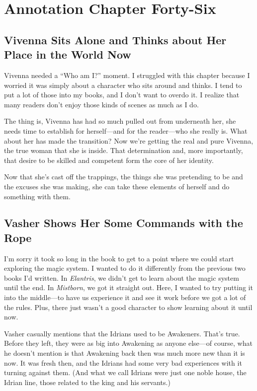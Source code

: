 \section{Annotation Chapter Forty-Six}

\subsection*{Vivenna Sits Alone and Thinks about Her Place in the World Now}

Vivenna needed a “Who am I?” moment. I struggled with this chapter because I worried it was simply about a character who sits around and thinks. I tend to put a lot of those into my books, and I don’t want to overdo it. I realize that many readers don’t enjoy those kinds of scenes as much as I do.

The thing is, Vivenna has had so much pulled out from underneath her, she needs time to establish for herself—and for the reader—who she really is. What about her has made the transition? Now we’re getting the real and pure Vivenna, the true woman that she is inside. That determination and, more importantly, that desire to be skilled and competent form the core of her identity.

Now that she’s cast off the trappings, the things she was pretending to be and the excuses she was making, she can take these elements of herself and do something with them.

\subsection*{Vasher Shows Her Some Commands with the Rope}

I’m sorry it took so long in the book to get to a point where we could start exploring the magic system. I wanted to do it differently from the previous two books I’d written. In \textit{Elantris}, we didn’t get to learn about the magic system until the end. In \textit{Mistborn}, we got it straight out. Here, I wanted to try putting it into the middle—to have us experience it and see it work before we got a lot of the rules. Plus, there just wasn’t a good character to show learning about it until now.

Vasher casually mentions that the Idrians used to be Awakeners. That’s true. Before they left, they were as big into Awakening as anyone else—of course, what he doesn’t mention is that Awakening back then was much more new than it is now. It was fresh then, and the Idrians had some very bad experiences with it turning against them. (And what we call Idrians were just one noble house, the Idrian line, those related to the king and his servants.)

